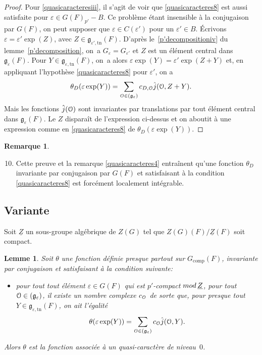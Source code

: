 \documentclass[11pt]{article}
\newcommand{\skpt}{\smallskip}
\numberwithin{equation}{section}\providecommand{\og}{«\,}\providecommand{\fg}{\,»}
\let\mathcal \EuScript
\newcommand{\NoChangel}[1]{%
\expandafter\let\csname old\string#1\endcsname=#1
\let#1=\relax
\newcommand{#1}{\mathcode`l="716C\csname old\string#1\endcsname\mathcode`l="7160 }%
}
\let\epsilon\varepsilon
\newcommand{\rmod}{\textup{mod}\,}
\newcommand{\frg}{\mathfrak{g}}
\newcommand{\comp}{\mathrm{comp}}
\newcommand{\Nil}{\mathrm{Nil}} \NoChangel{\Nil}
\newcommand{\tn}{\mathrm{tn}}
\newcommand{\cO}{\mathcal{O}}
\theoremstyle{plain}
\newtheorem*{lem*}{Lemme}
\theoremstyle{definition}
\newtheorem*{rem*}{Remarque}
\begin{document}
\begin{proof}
Pour \eqref{quasicaracteresiii}, il s'agit de voir que \eqref{quasicaracteres8} est aussi satisfaite pour $\epsilon\in G(F)_{p'}-B$. Ce problème étant insensible à la conjugaison par $G(F)$, on peut supposer que $\epsilon\in C(\epsilon')$ pour un $\epsilon'\in B$. Écrivons $\epsilon=\epsilon'\exp(Z)$, avec $Z\in \frg_{\epsilon',\tn}(F)$. D'après le~\eqref{p'decompositioniv} du lemme~\ref{p'decomposition}, on~a $G_{\epsilon}=G_{\epsilon'}$ et $Z$ est un élément central dans $\frg_{\epsilon}(F)$. Pour $Y\in \frg_{\epsilon,\tn}(F)$, on~a alors $\epsilon \exp(Y)=\epsilon' \exp(Z+Y)$ et, en appliquant l'hypothèse \eqref{quasicaracteres8} pour $\epsilon'$, on a
\[
\theta_{D}(\epsilon \exp(Y))=\sum_{\cO\in \Nil(\frg_{\epsilon})}c_{D,\cO}\hat{j}(\cO,Z+Y).
\]
Mais les fonctions $\hat{j}(\cO)$ sont invariantes par translations par tout élément central dans $\frg_{\epsilon}(F)$. Le $Z$ disparaît de l'expression ci-dessus et on aboutit à une expression comme en \eqref{quasicaracteres8} de $\theta_{D}(\epsilon \exp(Y))$.
\end{proof}

\skpt
\begin{rem*}
\begin{enumerate}\setcounter{enumi}{9}
\item
Cette preuve et la remarque \eqref{quasicaracteres4} entraînent qu'une fonction $\theta_{D}$ invariante par conjugaison par $G(F)$ et satisfaisant à la condition \eqref{quasicaracteres8} est forcément localement intégrable.
\end{enumerate}
\end{rem*}

\subsection{Variante}\label{variante1}
Soit $\underline{Z}$ un sous-groupe algébrique de $Z(G)$ tel que $Z(G)(F)/ \underline{Z}(F)$ soit compact.

\begin{lem*}
Soit $\theta$ une fonction définie presque partout sur $G_{\comp}(F)$, invariante par conjugaison et satisfaisant à la condition suivante:
\begin{itemize}
\item
pour tout tout élément $\epsilon\in G(F)$ qui est $p'$-compact $\rmod\underline{Z}$, pour tout $\cO\in \Nil(\frg_{\epsilon})$, il existe un nombre complexe $c_{\cO}$ de sorte que, pour presque tout $Y\in \frg_{\epsilon,\tn}(F)$, on ait l'égalité
\[
\theta(\epsilon \exp(Y))=\sum_{\cO\in \Nil(\frg_{\epsilon})}c_{\cO}\hat{j}(\cO,Y).
\]

\end{itemize}
Alors $\theta$ est la fonction associée à un quasi-caractère de niveau~$0$.
\end{lem*}
\end{document}
